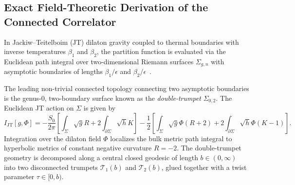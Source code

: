 \documentclass[11pt,a4paper,reqno]{article}
\theoremstyle{plain}
\theoremstyle{definition}
\theoremstyle{remark}
\numberwithin{equation}{section}
\begin{document}
\subsection{Exact Field-Theoretic Derivation of the Connected Correlator}
\label{subsec:sss_derivation}
In Jackiw--Teitelboim (JT) dilaton gravity coupled to thermal boundaries with inverse temperatures $\beta_1$ and $\beta_2$, the partition function is evaluated via the Euclidean path integral over two-dimensional Riemann surfaces $\Sigma_{g,n}$ with asymptotic boundaries of lengths $\beta_1/\epsilon$ and $\beta_2/\epsilon$~\cite{SaadShenkerStanford2019}.

The leading non-trivial connected topology connecting two asymptotic boundaries is the genus-$0$, two-boundary surface known as the \emph{double-trumpet} $\Sigma_{0,2}$. The Euclidean JT action on $\Sigma$ is given by
\begin{equation}
  I_{\mathrm{JT}}[g, \Phi] = - \frac{S_0}{2\pi} \left[ \int_{\Sigma} \sqrt{g} R + 2 \int_{\partial \Sigma} \sqrt{h} K \right] - \frac{1}{2} \left[ \int_{\Sigma} \sqrt{g} \Phi (R + 2) + 2 \int_{\partial \Sigma} \sqrt{h} \Phi (K - 1) \right].
\end{equation}
Integration over the dilaton field $\Phi$ localizes the bulk metric path integral to hyperbolic metrics of constant negative curvature $R = -2$. The double-trumpet geometry is decomposed along a central closed geodesic of length $b \in (0, \infty)$ into two disconnected trumpets $\mathcal{T}_1(b)$ and $\mathcal{T}_2(b)$, glued together with a twist parameter $\tau \in [0, b)$.
\end{document}
